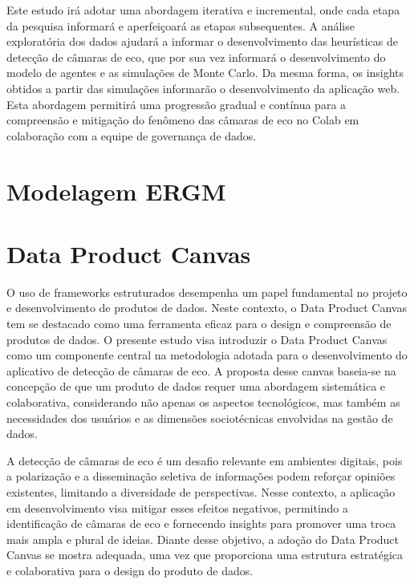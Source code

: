 Este estudo irá adotar uma abordagem iterativa e incremental, onde cada etapa da pesquisa informará e aperfeiçoará as etapas subsequentes. A análise exploratória dos dados ajudará a informar o desenvolvimento das heurísticas de detecção de câmaras de eco, que por sua vez informará o desenvolvimento do modelo de agentes e as simulações de Monte Carlo. Da mesma forma, os insights obtidos a partir das simulações informarão o desenvolvimento da aplicação web. Esta abordagem permitirá uma progressão gradual e contínua para a compreensão e mitigação do fenômeno das câmaras de eco no Colab em colaboração com a equipe de governança de dados.



\section{Modelagem ERGM}
\lipsum[1]

\section{Data Product Canvas}
O uso de frameworks estruturados desempenha um papel fundamental no projeto e desenvolvimento de produtos de dados. Neste contexto, o Data Product Canvas tem se destacado como uma ferramenta eficaz para o design e compreensão de produtos de dados. O presente estudo visa introduzir o Data Product Canvas como um componente central na metodologia adotada para o desenvolvimento do aplicativo de detecção de câmaras de eco. A proposta desse canvas baseia-se na concepção de que um produto de dados requer uma abordagem sistemática e colaborativa, considerando não apenas os aspectos tecnológicos, mas também as necessidades dos usuários e as dimensões sociotécnicas envolvidas na gestão de dados.

A detecção de câmaras de eco é um desafio relevante em ambientes digitais, pois a polarização e a disseminação seletiva de informações podem reforçar opiniões existentes, limitando a diversidade de perspectivas. Nesse contexto, a aplicação em desenvolvimento visa mitigar esses efeitos negativos, permitindo a identificação de câmaras de eco e fornecendo insights para promover uma troca mais ampla e plural de ideias. Diante desse objetivo, a adoção do Data Product Canvas se mostra adequada, uma vez que proporciona uma estrutura estratégica e colaborativa para o design do produto de dados.


